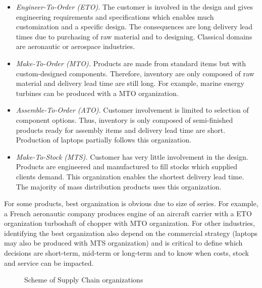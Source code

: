 \begin{itemize}
  \item \emph{Engineer-To-Order (ETO).}
  The customer is involved in the design and gives engineering requirements and specifications which enables much customization and a specific design.
  The consequences are long delivery lead times due to purchasing of raw material and to designing.
  Classical domains are aeronautic or aerospace industries.

  \item \emph{Make-To-Order (MTO).}
  Products are made from standard items but with custom-designed components.
  Therefore, inventory are only composed of raw material and delivery lead time are still long.
  For example, marine energy turbines can be produced with a MTO organization.

  \item \emph{Assemble-To-Order (ATO).}
  Customer involvement is limited to selection of component options.
  Thus, inventory is only composed of semi-finished products ready for assembly items and delivery lead time are short.
  Production of laptops partially follows this organization.

  \item \emph{Make-To-Stock (MTS).}
  Customer has very little involvement in the design.
  Products are engineered and manufactured to fill stocks which supplied clients demand.
  This organization enables the shortest delivery lead time.
  The majority of mass distribution products uses this organization.
\end{itemize}
For some products, best organization is obvious due to size of series.
For example, a French aeronautic company produces engine of an aircraft carrier with a ETO organization  turboshaft of chopper with MTO organization.
For other industries, identifying the best organization also depend on the commercial strategy (laptops may also be produced with MTS organization) and is critical to define which decisions are short-term, mid-term or long-term and to know when costs, stock and service can be impacted.


\begin{figure}[h]
  \centering
  \caption{Scheme of Supply Chain organizations}
  \label{fig:supply-chain-models}
\end{figure}



